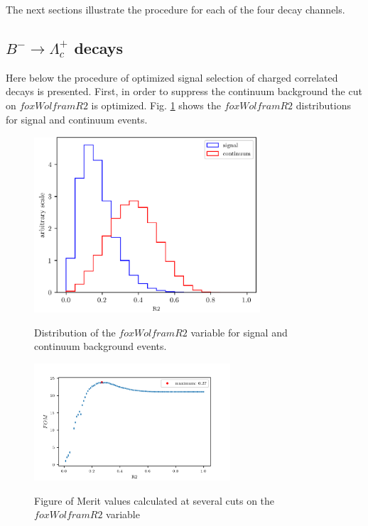 The next sections illustrate the procedure for each of the four decay channels.

\newpage

\subsection{$B^- \rightarrow \Lambda_c^+$ decays}
\label{sec:chargedCorrBtoLambdaC}

Here below the procedure of optimized signal selection of charged correlated decays is presented. 
\newline First, in order to suppress the continuum background the cut on $foxWolframR2$ is optimized. Fig. \ref{fig:R2distributions} shows the $foxWolframR2$ distributions for signal and continuum events. 
\begin{figure}[H]
{\includegraphics[width=0.75\textwidth]{03-Selection/figs/R2EventLevel_sig_qqbar_distributions.png}}
\caption{Distribution of the $foxWolframR2$ variable for signal and continuum background events.}
\label{fig:R2distributions}
\end{figure}


\begin{figure}[h!]
{\includegraphics[width=0.65\textwidth]{03-Selection/figs/corr_chargedB_FOMvsR2_cut.png}}
\caption{Figure of Merit values calculated at several cuts on the $foxWolframR2$ variable}
\label{fig:corr_chargedB_FOMvsR2_cut}
\end{figure}


